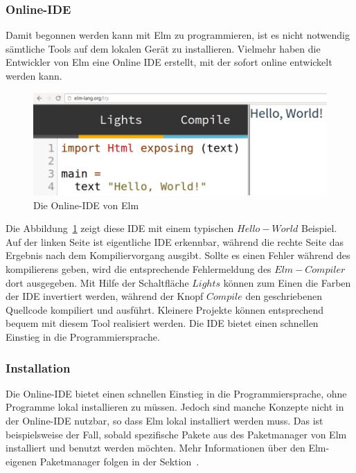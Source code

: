 \subsubsection{Online-IDE}
\label{sec:Online-IDE}
Damit begonnen werden kann mit Elm zu programmieren, ist es nicht notwendig sämtliche Tools auf dem lokalen Gerät zu installieren. Vielmehr haben die Entwickler von Elm eine Online \ac{IDE} erstellt, mit der sofort online entwickelt werden kann.
\begin{figure}[h]
	\centering
	\includegraphics[scale=0.4]{img/elm-try.png}
	\caption{Die Online-\ac{IDE} von Elm}\label{fig:elm-try}
\end{figure}
Die Abbildung~\ref{fig:elm-try} zeigt diese \ac{IDE} mit einem typischen $Hello-World$ Beispiel. Auf der linken Seite ist eigentliche \ac{IDE} erkennbar, während die rechte Seite das Ergebnis nach dem Kompiliervorgang ausgibt. Sollte es einen Fehler während des kompilierens geben, wird die entsprechende Fehlermeldung des $Elm-Compiler$ dort ausgegeben. Mit Hilfe der Schaltfläche $Lights$ können zum Einen die Farben der \ac{IDE} invertiert werden, während der Knopf $Compile$ den geschriebenen Quellcode kompiliert und ausführt. Kleinere Projekte können entsprechend bequem mit diesem Tool realisiert werden. Die \ac{IDE} bietet einen schnellen Einstieg in die Programmiersprache.


\subsubsection{Installation}
\label{sec:Installation}
Die Online-\ac{IDE} bietet einen schnellen Einstieg in die Programmiersprache, ohne Programme lokal installieren zu müssen. Jedoch sind manche Konzepte nicht in der Online-\ac{IDE} nutzbar, so dass Elm lokal installiert werden muss. Das ist beispielsweise der Fall, sobald spezifische Pakete aus des Paketmanager von Elm installiert und benutzt werden möchten. Mehr Informationen über den Elm-eigenen Paketmanager folgen in der Sektion~.

